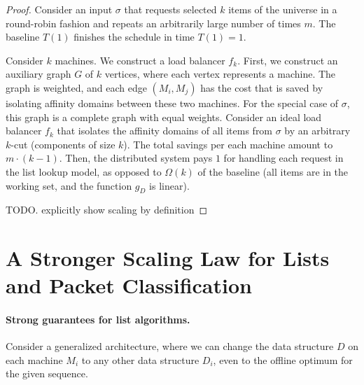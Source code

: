 \begin{proof}
	Consider an input $\sigma$ that requests selected $k$ items of the universe in a round-robin fashion and repeats an arbitrarily large number of times $m$.
	The baseline $T(1)$ finishes the schedule in time $T(1) = 1$.

Consider $k$ machines. We construct a load balancer $f_k$.
First, we construct an auxiliary graph $G$ of $k$ vertices, where each vertex represents a machine. The graph is weighted, and each edge $(M_i, M_j)$ has the cost that is saved by isolating affinity domains between these two machines. For the special case of $\sigma$, this graph is a complete graph with equal weights.
Consider an ideal load balancer $f_k$ that isolates the affinity domains of all items from $\sigma$ by an arbitrary $k$-cut (components of size $k$)\cite{Frieze97, Mahajan95}. The total savings per each machine amount to $m\cdot(k-1)$.
Then, the distributed system pays $1$ for handling each request in the list lookup model, as opposed to $\Omega(k)$ of the baseline (all items are in the working set, and the function $g_D$ is linear).


TODO. explicitly show scaling by definition







\end{proof}

\section{A Stronger Scaling Law for Lists and Packet Classification}

\paragraph*{Strong guarantees for list algorithms.}
Consider a generalized architecture, where we can change the data structure $D$ on each machine $M_i$ to any other data structure $D_i$, even to the offline optimum for the given sequence. 

